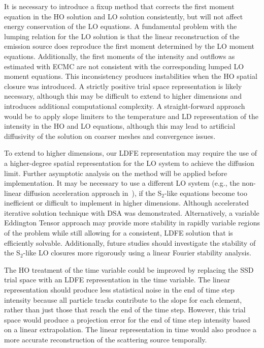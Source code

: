 It is necessary to introduce a fixup method that corrects the first moment equation in the HO solution and
LO solution consistently, but will not affect energy conservation of the LO equations.  
A fundamental problem with the lumping relation for the LO solution is that the linear reconstruction of the
emission source does reproduce the first moment determined by the LO moment equations.
Additionally, the first moments of the intensity and outflows as estimated with ECMC are not
consistent with the corresponding lumped LO moment equations.
This inconsistency produces instabilities when the HO spatial closure was introduced.
A strictly positive trial space representation is likely
necessary, although this may be difficult to extend to higher dimensions and introduces
additional computational complexity.
A straight-forward approach would be
to apply slope limiters to the temperature and LD representation of the intensity in the
HO and LO equations, although this may lead to artificial diffusivity of the solution on
coarser meshes and convergence issues. 


To extend to higher dimensions, our LDFE representation may require the use of a higher-degree
spatial representation for the LO system to achieve the diffusion
limit. Further asymptotic
analysis on the method will be applied before implementation. It may be necessary to use a different LO system (e.g., the non-linear diffusion
acceleration approach in~\cite{rmc}), if the S$_2$-like equations become too
inefficient or difficult to implement in higher dimensions. Although accelerated iterative
solution technique with DSA was demonstrated.  Alternatively, a variable Eddington Tensor approach may provide more stability in rapidly variable
regions of the problem while still allowing for a consistent, LDFE solution that is efficiently solvable.
Additionally, future studies should investigate the stability of the S$_2$-like LO closures more rigorously using a linear
Fourier stability analysis. 

The HO treatment of the time variable could be improved by replacing the SSD trial space
with an LDFE representation in the time variable. The linear representation should produce
less statistical noise in the end of time step intensity  because all particle tracks
contribute to the slope for each element, rather than just those that reach the end of the
time step.  However, this trial space would produce a projection error for the end of time step
intensity based on a linear extrapolation.  The
linear representation in time would also produce a more accurate reconstruction of the
scattering source temporally. 


